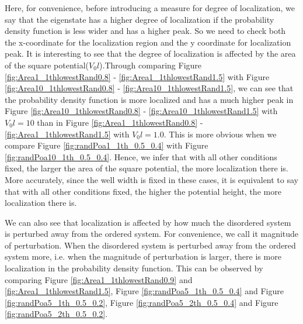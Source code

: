 Here, for convenience, before introducing a measure for degree of localization, we say that the eigenstate has a higher degree of localization if the probability density function is less wider and has a higher peak. So we need to check both the x-coordinate for the localization region and the y coordinate for localization peak. It is interesting to see that the degree of localization is affected by the area of the square potential($V_0l$).Through comparing Figure \ref{fig:Area1_1thlowestRand0.8} - \ref{fig:Area1_1thlowestRand1.5} with Figure \ref{fig:Area10_1thlowestRand0.8} - \ref{fig:Area10_1thlowestRand1.5}, we can see that the probability density function is more localized and has a much higher peak in Figure \ref{fig:Area10_1thlowestRand0.8} - \ref{fig:Area10_1thlowestRand1.5} with $V_0l = 10$ than in Figure \ref{fig:Area1_1thlowestRand0.8} - \ref{fig:Area1_1thlowestRand1.5} with $V_0l = 1.0$. This is more obvious when we compare Figure  \ref{fig:randPoa1_1th_0.5_0.4} with Figure \ref{fig:randPoa10_1th_0.5_0.4}. Hence, we infer that with all other conditions fixed, the larger the area of the square potential, the more localization there is. More accurately, since the well width is fixed in these cases, it is equivalent to say that with all other conditions fixed, the higher the potential height, the more localization there is. 

We can also see that localization is affected by how much the disordered system is perturbed away from the ordered system. For convenience, we call it magnitude of perturbation. When the disordered system is perturbed away from the ordered system more, i.e. when the magnitude of perturbation is larger,  there is more localization in the probability density function. This can be observed by comparing Figure \ref{fig:Area1_1thlowestRand0.9} and \ref{fig:Area1_1thlowestRand1.5}, Figure \ref{fig:randPoa5_1th_0.5_0.4} and Figure \ref{fig:randPoa5_1th_0.5_0.2}, Figure \ref{fig:randPoa5_2th_0.5_0.4} and Figure \ref{fig:randPoa5_2th_0.5_0.2}. 

